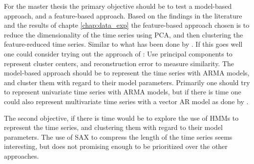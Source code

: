 For the master thesis the primary objective should be to test a model-based approach, and a feature-based approach. 
Based on the findings in the literature and the results of chapte \ref{chap:data_exp} the feature-based approach chosen is to reduce the dimensionality of the time series using PCA, and then clustering the feature-reduced time series. 
Similar to what has been done by \textcite{fault_detect_PARAFAC_k_means}. 
If this goes well one could consider trying out the approach of \textcite{multivariate_tsc_common_pca}: Use principal components to represent cluster centers, and reconstruction error to measure similarity.
The model-based approach should be to represent the time series with ARMA models, and cluster them with regard to their model parameters. Primarily one should try to represent univariate time series with ARMA models, but if there is time one could also represent multivariate time series with a vector AR model as done by \textcite{var_multivar_tsc}.

The second objective, if there is time would be to explore the use of HMMs to represent the time series, and clustering them with regard to their model parameters. The use of SAX to compress the length of the time series seems interesting, but does not promising enough to be prioritized over the other approaches. 
